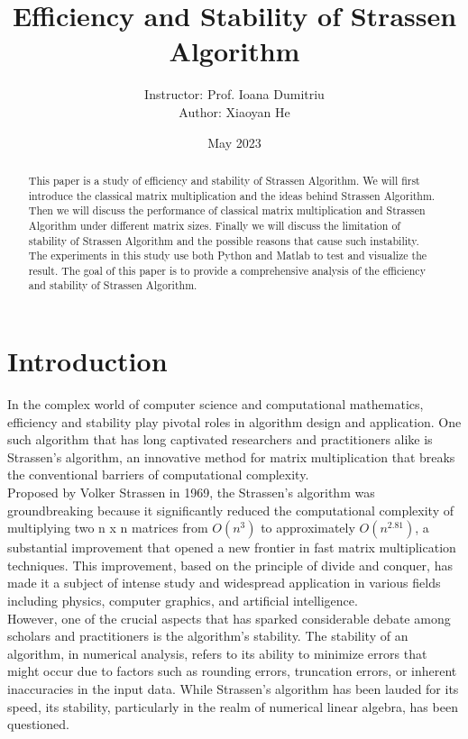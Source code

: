 \documentclass{article}
\title{Efficiency and Stability of Strassen Algorithm}
\author{Instructor: Prof. Ioana Dumitriu\\
Author: Xiaoyan He}
\date{May 2023}
\begin{document}
\maketitle

\begin{abstract}
    This paper is a study of efficiency and stability of Strassen Algorithm. We will first introduce the classical matrix multiplication
    and the ideas behind Strassen Algorithm. Then we will discuss the performance of classical matrix multiplication and Strassen Algorithm
    under different matrix sizes. Finally we will discuss the limitation of stability of Strassen Algorithm and the possible reasons that 
    cause such instability. The experiments in this study use both Python and Matlab to test and visualize the result. The goal of this 
    paper is to provide a comprehensive analysis of the efficiency and stability of Strassen Algorithm.

\end{abstract}

\section{Introduction}
\hspace{5.5mm}In the complex world of computer science and computational mathematics, efficiency and stability play pivotal 
roles in algorithm design and application. One such algorithm that has long captivated researchers and practitioners 
alike is Strassen's algorithm, an innovative method for matrix multiplication that breaks the conventional barriers 
of computational complexity.\\

Proposed by Volker Strassen in 1969, the Strassen's algorithm was groundbreaking because it significantly reduced the 
computational complexity of multiplying two n x n matrices from $O(n^3)$ to approximately $O(n^{2.81})$, a substantial improvement 
that opened a new frontier in fast matrix multiplication techniques. This improvement, based on the principle of divide and 
conquer, has made it a subject of intense study and widespread application in various fields including physics, computer 
graphics, and artificial intelligence.\\

However, one of the crucial aspects that has sparked considerable debate among scholars and practitioners is the algorithm's 
stability. The stability of an algorithm, in numerical analysis, refers to its ability to minimize errors that might occur due 
to factors such as rounding errors, truncation errors, or inherent inaccuracies in the input data. While Strassen's algorithm has 
been lauded for its speed, its stability, particularly in the realm of numerical linear algebra, has been questioned.\\
\end{document}
